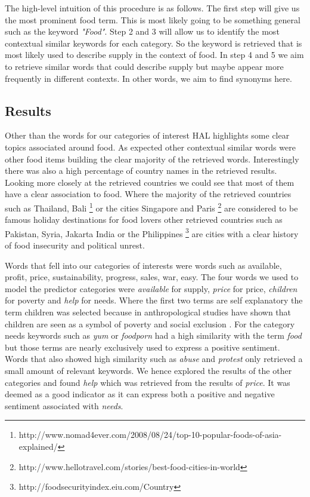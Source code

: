 The high-level intuition of this procedure is as follows. The first step will give us the most prominent food term. This is most likely going to be something general such as the keyword \emph{"Food"}. Step 2 and 3 will allow us to identify the most contextual similar keywords for each category. So the keyword is retrieved that is most likely used to describe supply in the context of food. In step 4 and 5 we aim to retrieve similar words that could describe supply but maybe appear more frequently in different contexts. In other words, we aim to find synonyms here.   

\subsection{Results  }

Other than the words for our categories of interest HAL highlights some clear topics associated around food. As expected other contextual similar words were other food items building the clear majority of the retrieved words. Interestingly there was also a high percentage of country names in the retrieved results. Looking more closely at the retrieved countries we could see that most of them have a clear association to food. Where the majority of the retrieved countries such as Thailand, Bali \footnote{http://www.nomad4ever.com/2008/08/24/top-10-popular-foods-of-asia-explained/} or the cities Singapore and Paris \footnote{http://www.hellotravel.com/stories/best-food-cities-in-world} are considered to be famous holiday destinations for food lovers other retrieved countries such as Pakistan, Syria, Jakarta India or the Philippines \footnote{http://foodsecurityindex.eiu.com/Country} are cities with a clear history of food insecurity and political unrest. 

Words that fell into our categories of interests were words such as available, profit, price, sustainability, progress, sales,  war, easy. The four words we used to model the predictor categories were \emph{available} for supply, \emph{price} for price, \emph{children} for poverty and \emph{help} for needs. Where the first two terms are self explanatory the term children was selected because in \cite{brick02} anthropological studies have shown that children are seen as a symbol of poverty and social exclusion . For the category needs keywords such as \emph{yum} or \emph{foodporn} had a high similarity with the term \emph{food} but those terms are nearly exclusively used to express a positive sentiment. Words that also showed high similarity such as \emph{abuse} and \emph{protest} only retrieved a small amount of relevant keywords. We hence explored the results of the other categories and found \emph{help} which was retrieved from the results of \emph{ price}. It was deemed as a good indicator as it can express both a positive and negative sentiment associated with \emph{needs}.

